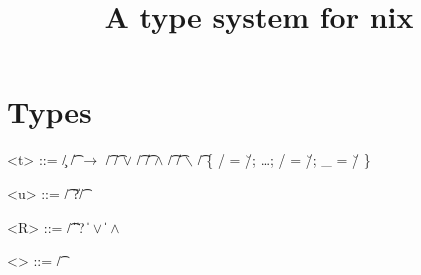 

\title{A type system for nix}



\maketitle{}

\section{Types}
\begin{grammar}
  <t> ::= \c/ \| \t/ $\bm{\rightarrow}$ \t/
    \alt \t/ $\bm{\vee}$ \t/ \| \t/ $\bm{\wedge}$ \t/ \| \t/ $\bm{\backslash}$ \t/
    \alt [\meta{R}]
    \alt \{ \s/ = \u/; \ldots{}; \s/ = \u/; _ = \u/ \}

  <u> ::= \t/ \| ?\t/

  <R> ::= \t/ \|  \| ?
    \|  $\bm{\vee}$  \|  $\bm{\wedge}$ 

  <\τ> ::= \t/ %
\end{grammar}

